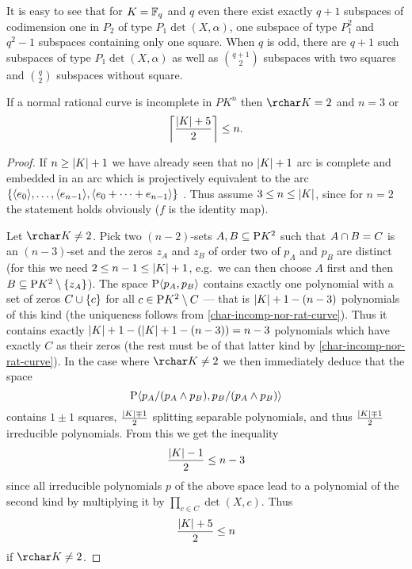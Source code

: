 \begin{remark}
    It is easy to see that for $K=\mathbb{F}_{q}$ and $q$ even there exist exactly $q + 1$ subspaces of codimension one in $P_2$ of type $P_1\det(X,\alpha)$, one subspace of type $P_1^2$ and $q^2-1$ subspaces containing only one square.
    When $q$ is odd, there are $q+1$ such subspaces of type $P_1\det(X,\alpha)$ as well as $\binom {q+1} 2$ subspaces with two squares and $\binom q 2$ subspaces without square.  
\end{remark}

\begin{lemma}
    If a normal rational curve is incomplete in $P K^n$ then $\rchar K =2$ and $n=3$ or
    $$
    \left\lceil\frac{\left\vert{K}\right\vert + 5} 2\right\rceil\leq n.
    $$
\end{lemma}

\begin{proof}
    If $n\geq \left\vert{K}\right\vert + 1$ we have already seen that no $\left\vert{K}\right\vert +1$ arc is complete and embedded in an arc which is projectively equivalent to the arc $\set{\gen{e_0},\ldots,\gen{e_{n-1}},\gen{e_0+\cdots+e_{n-1}}}$ . Thus assume $3\leq n\leq \left\vert{K}\right\vert$, since for $n=2$ the statement holds obviously ($f$ is the identity map).

    Let $\rchar K\neq 2$. Pick two $(n-2)$-sets $A,B\setleq \P K^2$ such that $A\cap B =C$ is an $(n-3)$-set and the zeros $z_A$ and $z_B$ of order two of $p_A$ and $p_B$ are distinct (for this we need $2 \leq n-1\leq \left\vert{K}\right\vert +1$, e.g.~we can then choose $A$ first and then $B\setleq \P K^2\setminus\set{z_A}$).
    The space $\P\gen{p_A,p_B}$ contains exactly one polynomial with a set of zeros $C\setjoin\set c$ for all $c\in\P K^2\setminus C$ --- that is $\left\vert{K}\right\vert + 1 - (n-3)$ polynomials of this kind (the uniqueness follows from \autoref{char-incomp-nor-rat-curve}). Thus it contains exactly $\left\vert{K}\right\vert + 1 - (\left\vert{K}\right\vert + 1 - (n-3))=n-3$ polynomials which have exactly $C$ as their zeros (the rest must be of that latter kind by \autoref{char-incomp-nor-rat-curve}). In the case where $\rchar K\neq 2$ we then immediately deduce that the space
    $$
    \P\gen{p_A/(p_A\meet p_B),p_B/(p_A\meet p_B)}
    $$
    contains $1\pm 1$ squares, $\frac{\left\vert{K}\right\vert \mp 1} 2$ splitting separable polynomials, and thus $\frac{\left\vert{K}\right\vert \mp 1} 2$ irreducible polynomials.
    From this we get the inequality
    $$
    \frac{\left\vert{K}\right\vert - 1} 2\leq n-3
    $$
    since all irreducible polynomials $p$ of the above space lead to a polynomial of the second kind by multiplying it by $\prod_{c\in C}{\det(X,c)}$. Thus
    $$
    \frac{\left\vert{K}\right\vert + 5} 2\leq n
    $$
    if $\rchar K\neq 2$.


\end{proof}
